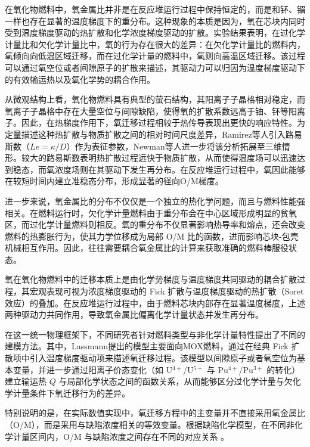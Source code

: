 在氧化物燃料中，氧金属比并非是在反应堆运行过程中保持恒定的，而是和钚、镅一样也存在显著的温度梯度下的重分布。这种现象的本质是因为，氧在芯块内同时受到温度梯度驱动的热扩散和化学浓度梯度驱动的扩散。实验结果表明\cite{ewartOxygenPotentialMeasurements1984}，在过化学计量比和欠化学计量比中，氧的行为存在很大的差异：在欠化学计量比的燃料内，氧倾向向低温区域迁移，而在过化学计量的燃料中，氧则向高温区域迁移。该过程可以通过氧空位或者间隙原子的扩散来描述，其驱动力可以归因为温度梯度驱动下的有效输运热以及氧化学势的耦合作用。

从微观结构上看，氧化物燃料具有典型的萤石结构，其阳离子子晶格相对稳定，而氧离子子晶格中存在大量空位与间隙缺陷，使得氧的扩散系数远高于铀、钚等阳离子。因此，在热梯度作用下，氧迁移过程相较于热传导表现出更快的响应特性。为定量描述这种热扩散与物质扩散之间的相对时间尺度差异，Ramirez等人引入路易斯数（$Le = \kappa / D$）作为表征参数，Newman等人\cite{newmanThreeDimensionalCoupled2009}进一步将该分析拓展至三维情形。较大的路易斯数表明热扩散过程远快于物质扩散，从而使得温度场可以迅速达到稳态，而氧浓度场则在其驱动下发生再分布。在反应堆运行过程中，氧因此能够在较短时间内建立准稳态分布，形成显著的径向O/M梯度。

进一步来说，氧金属比的分布不仅仅是一个独立的热化学问题，而且与燃料性能强相关。在燃料运行时，欠化学计量燃料由于重分布会在中心区域形成明显的贫氧区，而过化学计量燃料则相反。氧的重分布不仅显著影响热导率和熔点，还会改变燃料的热膨胀行为，使其力学位移成为局部 O/M 比的函数，进而影响芯块-包壳机械相互作用。因此，往往需要耦合氧金属比的计算来获取准确的燃料棒服役状态。

氧在氧化物燃料中的迁移本质上是由化学势梯度与温度梯度共同驱动的耦合扩散过程，其宏观表现可视为浓度梯度驱动的 Fick 扩散与温度梯度驱动的热扩散（Soret 效应）的叠加。在反应堆运行过程中，由于燃料芯块内部存在显著温度梯度，上述两种驱动力共同作用，导致氧金属比偏离化学计量状态并发生再分布。

在这一统一物理框架下，不同研究者针对燃料类型与非化学计量特性提出了不同的建模方法。其中，Lassmann\cite{lassmannOxiredModelRedistribution1987}提出的模型主要面向MOX燃料，通过在经典 Fick 扩散项中引入温度梯度驱动项来描述氧迁移过程。该模型以间隙原子或者氧空位为基本变量，并进一步通过阳离子价态变化（如 U$^{4+}$/U$^{5+}$ 与 Pu$^{4+}$/Pu$^{3+}$ 的转化）建立输运热 $Q$ 与局部化学状态之间的函数关系，从而能够区分过化学计量与欠化学计量条件下氧迁移行为的差异。

特别说明的是，在实际数值实现中，氧迁移方程中的主变量并不直接采用氧金属比（O/M），而是采用与缺陷浓度相关的等效变量。根据缺陷化学模型，在不同非化学计量区间内，O/M 与缺陷浓度之间存在不同的对应关系 \cite{lassmannOxiredModelRedistribution1987}。

